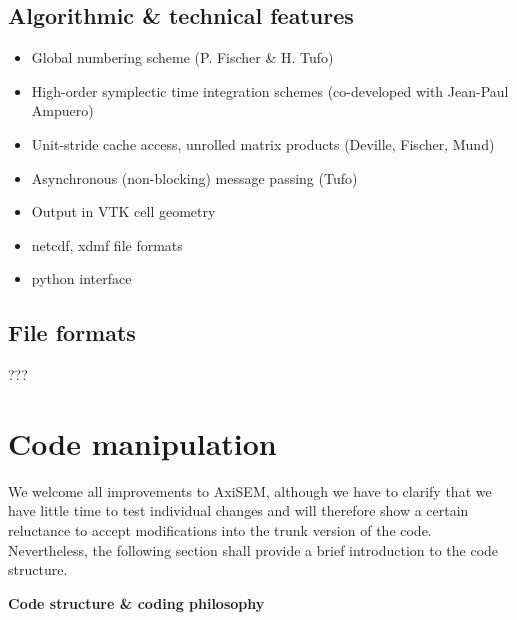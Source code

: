 \documentclass[11pt,letter,fleqn,english,notitlepage]{article}
\begin{document}
\subsection{Algorithmic \& technical features}
\begin{itemize}
    \item Global numbering scheme (P. Fischer \& H. Tufo)
    \item High-order symplectic time integration schemes (co-developed with Jean-Paul Ampuero)
    \item Unit-stride cache access, unrolled matrix products (Deville, Fischer, Mund)
    \item Asynchronous (non-blocking) message passing (Tufo)
    \item Output in VTK cell geometry
    \item netcdf, xdmf file formats
    \item python interface 
\end{itemize}

\subsection{File formats}
???



% 



\newpage
\section{Code manipulation}
We welcome all improvements to AxiSEM, although we have to clarify that we have little time to test individual changes and will therefore show a certain reluctance to accept modifications into the trunk version of the code. Nevertheless, the following section shall provide a brief introduction to the code structure.


\textbf{Code structure \& coding philosophy}
\end{document}
